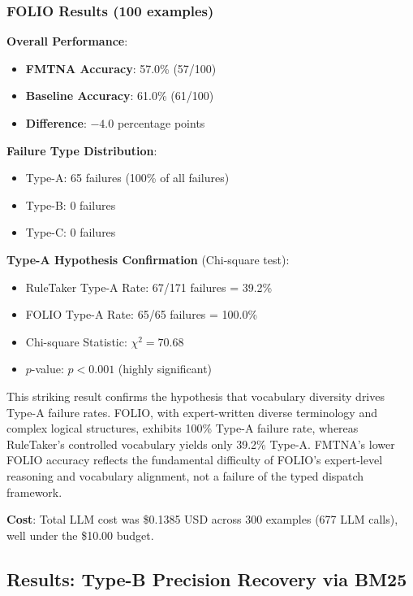 \documentclass[11pt,letterpaper]{article}
\begin{document}
\subsubsection{FOLIO Results (100 examples)}

\textbf{Overall Performance}:
\begin{itemize}
  \item \textbf{FMTNA Accuracy}: 57.0\% (57/100)
  \item \textbf{Baseline Accuracy}: 61.0\% (61/100)
  \item \textbf{Difference}: $-4.0$ percentage points
\end{itemize}

\textbf{Failure Type Distribution}:
\begin{itemize}
  \item Type-A: 65 failures (100\% of all failures)
  \item Type-B: 0 failures
  \item Type-C: 0 failures
\end{itemize}

\textbf{Type-A Hypothesis Confirmation} (Chi-square test):
\begin{itemize}
  \item RuleTaker Type-A Rate: 67/171 failures = 39.2\%
  \item FOLIO Type-A Rate: 65/65 failures = 100.0\%
  \item Chi-square Statistic: $\chi^2 = 70.68$
  \item $p$-value: $p < 0.001$ (highly significant)
\end{itemize}

This striking result confirms the hypothesis that vocabulary diversity drives Type-A failure rates. FOLIO, with expert-written diverse terminology and complex logical structures, exhibits 100\% Type-A failure rate, whereas RuleTaker's controlled vocabulary yields only 39.2\% Type-A. FMTNA's lower FOLIO accuracy reflects the fundamental difficulty of FOLIO's expert-level reasoning and vocabulary alignment, not a failure of the typed dispatch framework.

\textbf{Cost}: Total LLM cost was \$0.1385 USD across 300 examples (677 LLM calls), well under the \$10.00 budget.

\subsection{Results: Type-B Precision Recovery via BM25}
\end{document}
